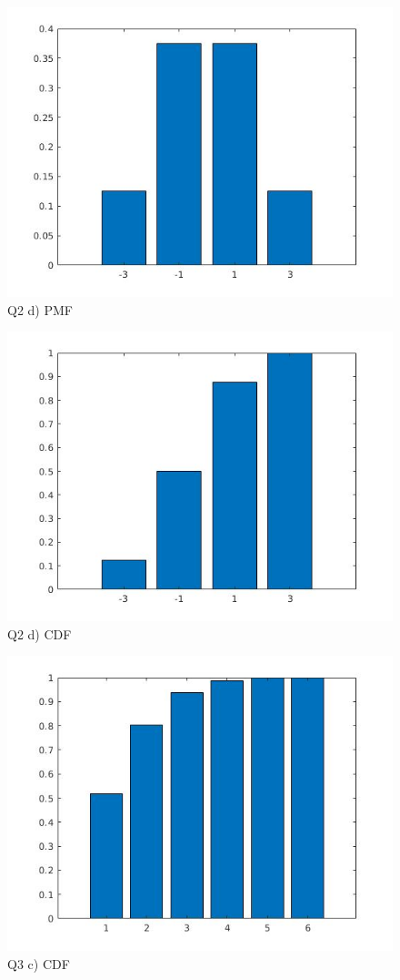 \documentclass{report}
\begin{document}
			
			
		
    \begin{figure}[ht!]
        \centering
        \includegraphics[width=\linewidth]{Q2_D_PMF.jpg}
        \caption{Q2 d) PMF}
    \end{figure}


    \begin{figure}[ht!]
        \centering
        \includegraphics[width=\linewidth]{Q2_D_CDF.jpg}
        \caption{Q2 d) CDF}
    \end{figure}

    \begin{figure}[ht!]
        \centering
        \includegraphics[width=\linewidth]{Q3_c_CDF.jpg}
        \caption{Q3 c) CDF}
    \end{figure}

		
\end{document}
